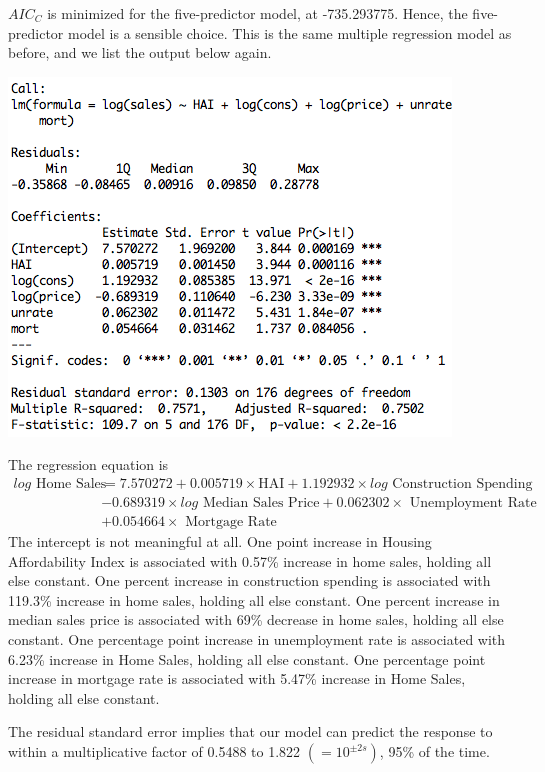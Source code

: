 \documentclass[a4 paper, 11 pt]{article}
\begin{document}
$AIC_C$ is minimized for the five-predictor model, at -735.293775. Hence, the five-predictor model is a sensible choice. This is the same multiple regression model as before, and we list the output below again.
\begin{center}
\includegraphics[scale=0.5]{reg}
\end{center}
The regression equation is
\begin{align*}
log \text{ Home Sales} &= 7.570272 + 0.005719 \times \text{HAI} + 1.192932 \times log \text{ Construction Spending} \\
&-0.689319 \times log \text{ Median Sales Price} + 0.062302 \times \text{ Unemployment Rate} \\
&+ 0.054664 \times \text{ Mortgage Rate}
\end{align*}
The intercept is not meaningful at all. One point increase in Housing Affordability Index is associated with 0.57\% increase in home sales, holding all else constant. One percent increase in construction spending is associated with 119.3\% increase in home sales, holding all else constant. One percent increase in median sales price is associated with 69\% decrease in home sales, holding all else constant. One percentage point increase in unemployment rate is associated with 6.23\% increase in Home Sales, holding all else constant. One percentage point increase in mortgage rate is associated with 5.47\% increase in Home Sales, holding all else constant.

The residual standard error implies that our model can predict the response to within a multiplicative factor of 0.5488 to 1.822 $(= 10^{\pm2s})$, 95\% of the time. %
\end{document}
